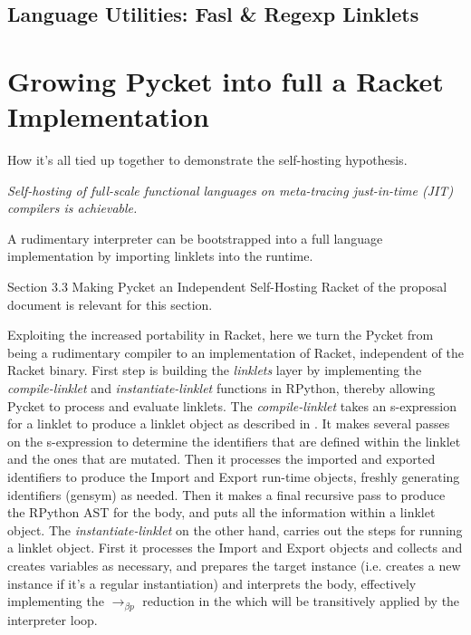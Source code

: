 		\subsection{Language Utilities: Fasl \& Regexp Linklets}

	\section{Growing Pycket into full a Racket Implementation}

		\begin{mainpoint}
            How it's all tied up together to demonstrate the self-hosting hypothesis.

			\textit{Self-hosting of full-scale functional languages on meta-tracing just-in-time (JIT) compilers is achievable.}
        \end{mainpoint}

        \begin{todo}
			A rudimentary interpreter can be bootstrapped into a full language implementation by importing linklets into the runtime.
		\end{todo}

		\begin{todo}[Import]
			Section 3.3 Making Pycket an Independent Self-Hosting Racket of the proposal document is relevant for this section.
		\end{todo}



		Exploiting the increased portability in Racket, here we turn the
Pycket from being a rudimentary compiler to an implementation of
Racket, independent of the Racket binary. First step is building the
\emph{linklets} layer by implementing the \emph{compile-linklet} and
\emph{instantiate-linklet} functions in RPython, thereby allowing
Pycket to process and evaluate linklets. The \emph{compile-linklet}
takes an s-expression for a linklet to produce a linklet object as
described in . It makes several
passes on the s-expression to determine the identifiers that are
defined within the linklet and the ones that are mutated. Then it
processes the imported and exported identifiers to produce the Import
and Export run-time objects, freshly generating identifiers (gensym)
as needed. Then it makes a final recursive pass to produce the RPython
AST for the body, and puts all the information within a linklet
object. The \emph{instantiate-linklet} on the other hand, carries out
the steps for running a linklet object. First it processes the Import
and Export objects and collects and creates variables as necessary,
and prepares the target instance (i.e. creates a new instance if it's
a regular instantiation) and interprets the body, effectively
implementing the $\longrightarrow_{\beta p}$ reduction in the 
which will be transitively applied by the interpreter loop.

